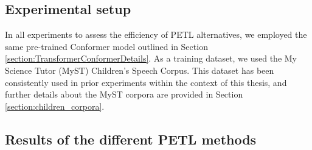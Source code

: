 \subsection{Experimental setup}

In all experiments to assess the efficiency of \ac{PETL} alternatives, we employed the same pre-trained Conformer model outlined in Section \ref{section:TransformerConformerDetails}. As a training dataset, we used the My Science Tutor (MyST) Children's Speech Corpus. This dataset has been consistently used in prior experiments within the context of this thesis, and further details about the MyST corpora are provided in Section \ref{section:children_corpora}.

\subsection{Results of the different PETL methods}

